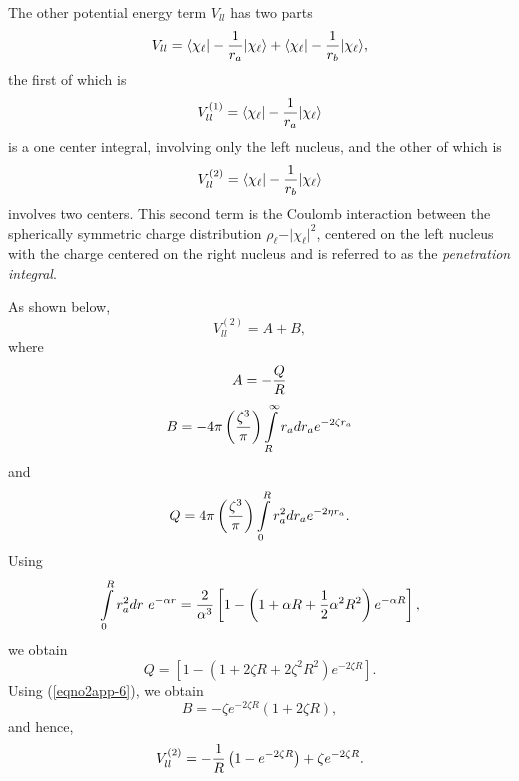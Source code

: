 The other potential energy term $V_{ll}$ has two
parts
\begin{equation}
V_{ll} = \langle \chi_\ell \vert - {1 \over r_a} \vert \chi_\ell 
\rangle + \langle \chi_\ell \vert - {1 \over r_b} \vert \chi_\ell \rangle ,
\end{equation}
the first of which is
\begin{equation}
V_{ll}^{(1)} = \langle \chi_\ell \vert - {1 \over r_a} \vert \chi_\ell 
\rangle
\end{equation}
is a one center integral, involving only the left nucleus, and the other 
of which is
\begin{equation}
V_{ll}^{(2)} = \langle \chi_\ell \vert - {1 \over r_b} \vert \chi_\ell 
\rangle
\end{equation}
involves two centers. This second term is the Coulomb interaction between
the spherically symmetric charge distribution $\rho_\ell - \vert \chi_\ell 
\vert^2$, centered on the left nucleus
with the charge centered on the right nucleus and is referred to as
the \emph{penetration integral}.
    
As shown below,
\begin{equation}
V_{ll}^{(2)} = A + B ,
\end{equation}
where
\begin{equation}
A = - {Q \over R}
\end{equation}
\begin{equation}
B = - 4 \pi \left( {\zeta^3 \over \pi} \right) \int\limits^{\infty}_{R} r_a 
dr_a e^{-2 \zeta r_a} 
\end{equation}
and
\begin{equation}
Q = 4 \pi \left( {\zeta^3 \over \pi} \right) \int\limits^{R}_{0} r^2_a 
dr_a e^{-2 \eta r_a} .
\end{equation}
Using
\begin{equation}
\int\limits^{R}_{0} r^2_a dr\ e^{- \alpha r} = {2 \over \alpha^3} 
\left[ 1 - \left( 1 + \alpha R + {1 \over 2} \alpha^2 R^2 \right) 
e^{- \alpha R} \right] ,
\end{equation}
we obtain
\begin{equation}
Q = \left[ 1 - \left( 1 + 2 \zeta R + 2 \zeta^2 R^2 \right) e^{- 2 
\zeta R} \right] .
\end{equation}
Using (\ref{eqno2app-6}), we obtain
\begin{equation}
B = - \zeta e^{-2 \zeta R} \left( 1 + 2 \zeta R \right),
\end{equation}
and hence,
\begin{equation}
V_{ll}^{(2)} = - {1 \over R} \left( 1 - e^{-2 \zeta R} \right) + 
\zeta e^{-2 \zeta R} .
\end{equation}

